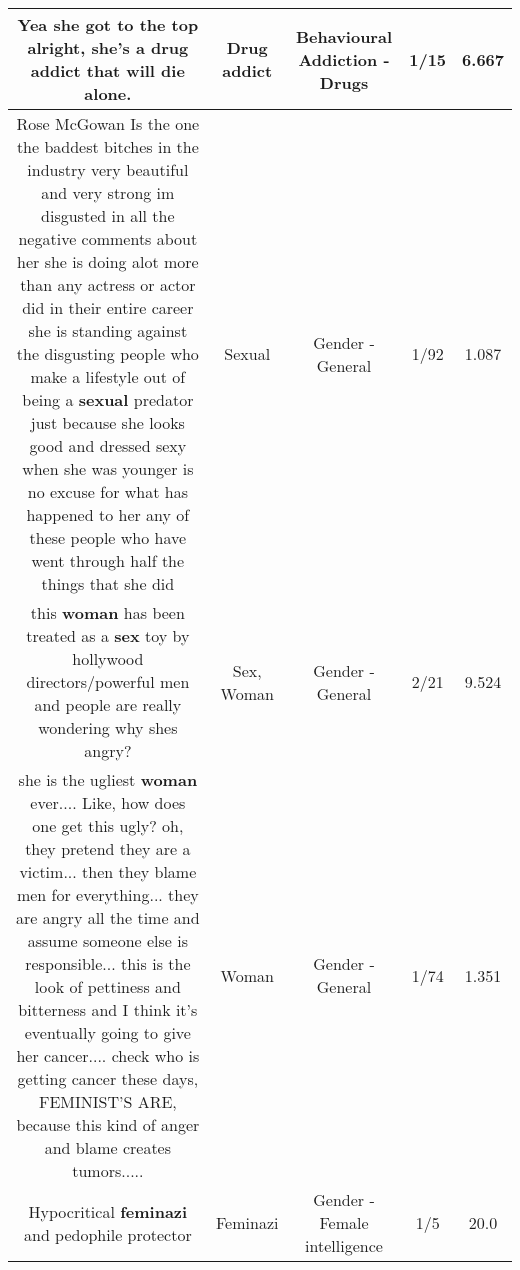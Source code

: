 \documentclass[11pt]{article}
\newlength\mylength
\begin{document}
\begin{center}
\begin{longtable}{|C{.65\mylength}|C{.30\mylength}|C{.12\mylength}|C{.12\mylength}|C{.12\mylength}|}
  \small Yea she got to the top alright, she's a \textbf{drug addict} that will die alone.\normalsize   & Drug addict & Behavioural Addiction - Drugs & 1/15 & 6.667 \\  \hline
  \small Rose McGowan Is the one the baddest bitches in the industry very beautiful and very strong im disgusted in all the negative comments about her she is doing alot more than any actress or actor did in their entire career she is standing against the disgusting people who make a lifestyle out of being a \textbf{sexual} predator just because she looks good and dressed sexy  when she was younger is no excuse for what has happened to her any of these people who have went through half the things that she did\normalsize   & Sexual & Gender - General & 1/92 & 1.087 \\  \hline
  \small this \textbf{woman} has been treated as a \textbf{sex} toy by hollywood directors/powerful men and people are really wondering why shes angry?\normalsize   & Sex, Woman & Gender - General & 2/21 & 9.524 \\  \hline
  \small she is the ugliest \textbf{woman} ever....   Like, how does one get this ugly? oh, they pretend they are a victim... then they blame men for everything... they are angry all the time and assume someone else is responsible... this is the look of pettiness and bitterness and I think it's eventually going to give her cancer.... check who is getting cancer these days,  FEMINIST'S ARE, because this kind of anger and blame creates tumors.....\normalsize   & Woman & Gender - General & 1/74 & 1.351 \\  \hline
  \small Hypocritical \textbf{feminazi} and pedophile protector\normalsize   & Feminazi & Gender - Female intelligence & 1/5 & 20.0 \\  \hline

\end{longtable}
\end{center}
\end{document}
